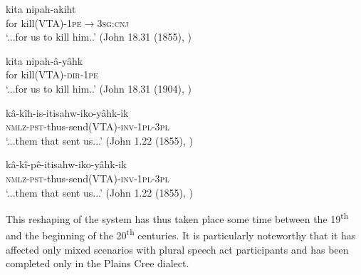 \documentclass[twoside,a4paper,11pt]{article}
\newcommand{\sg}{\textsc{sg}}
\newcommand{\pl}{\textsc{pl}}
\newcommand{\Σ}{\greek{Σ}}
\newcommand{\cnj}{\textsc{cnj}}
\newcommand{\dir}{\textsc{dir}}
\newcommand{\inv}{\textsc{inv}}
\newcommand{\nmlz}{\textsc{nmlz}}
\newcommand{\pe}{\textsc{pe}}
\newcommand{\pst}{\textsc{pst}}
\begin{document}
\begin{exe}
\ex 
\begin{xlist}
\ex \label{ex:oldercreeakiht}
 \gll kita nipah-akiht\\
{for} kill(VTA)-1\pe$\rightarrow$3\sg:\cnj\\
\glt `...for us to kill him..' (John 18.31 (1855),  \citealt[p. 3]{dahlstrom89change})

\ex \label{ex:newcreeakiht}
 \gll kita nipah-â-yâhk\\
{for} kill(VTA)-\dir-1\pe\\
\glt `...for us to kill him..' (John 18.31 (1904),  \citealt[p. 3]{dahlstrom89change})
\end{xlist}
\end{exe}

\begin{exe}
\ex 
\begin{xlist}
\ex \label{ex:oldikoyaahk}
 \gll kâ-kîh-is-itisahw-iko-yâhk-ik\\
\nmlz-\pst-thus-send(VTA)-\inv-1\pl-3\pl\\
\glt `...them that sent us...' (John 1.22 (1855),  \citealt[p. 3]{dahlstrom89change})

\ex \label{ex:newikoyaahk}
 \gll kâ-kî-pê-itisahw-iko-yâhk-ik\\
\nmlz-\pst-thus-send(VTA)-\inv-1\pl-3\pl\\
\glt `...them that sent us...' (John 1.22 (1855),  \citealt[p. 3]{dahlstrom89change})
\end{xlist}
\end{exe}

% 

This reshaping of the system has thus taken place some time between the 19\textsuperscript{th} and the beginning of the 20\textsuperscript{th} centuries. It is particularly noteworthy that it has affected only mixed scenarios with plural speech act participants and has been completed only in the Plains Cree dialect. 
\end{document}
